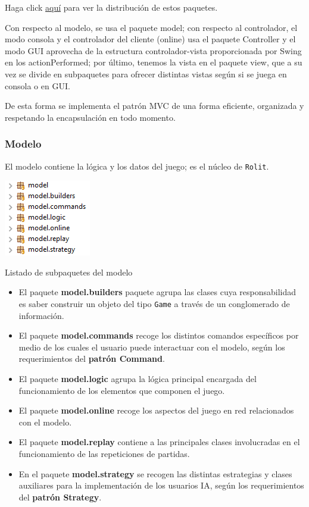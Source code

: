 \documentclass[../DocumentoOficial.tex]{subfiles}
\begin{document}
Haga click \href{run:./Disenyo/fotos/mvcuml.png}{aquí} para ver la distribución de estos paquetes.

Con respecto al modelo, se usa el paquete model; con respecto al controlador, el modo consola y el controlador del cliente (online) usa el paquete Controller y el modo GUI aprovecha de la estructura controlador-vista proporcionada por Swing en los actionPerformed; por último, tenemos la vista en el paquete view, que a su vez se divide en subpaquetes para ofrecer distintas vistas según si se juega en consola o en GUI.

De esta forma se implementa el patrón MVC de una forma eficiente, organizada y respetando la encapsulación en todo momento.

\subsubsection{Modelo}

El modelo contiene la lógica y los datos del juego; es el núcleo de \texttt{Rolit}.

\begin{center}
\includegraphics[scale=1.5]{modelpaquetes.png}

Listado de subpaquetes del modelo
\end{center}

\begin{itemize}

\item El paquete \textbf{model.builders} paquete agrupa las clases cuya responsabilidad es saber construir un objeto del tipo \texttt{Game} a través de un conglomerado de información.

\item El paquete \textbf{model.commands} recoge los distintos comandos específicos por medio de los cuales el usuario puede interactuar con el modelo, según los requerimientos del \textbf{patrón Command}.

\item El paquete \textbf{model.logic} agrupa la lógica principal encargada del funcionamiento de los elementos que componen el juego.

\item El paquete \textbf{model.online} recoge los aspectos del juego en red relacionados con el modelo.

\item El paquete \textbf{model.replay} contiene a las principales clases involucradas en el funcionamiento de las repeticiones de partidas.

\item En el paquete \textbf{model.strategy} se recogen las distintas estrategias y clases auxiliares para la implementación de los usuarios IA, según los requerimientos del \textbf{patrón Strategy}.

\end{itemize}
\end{document}

